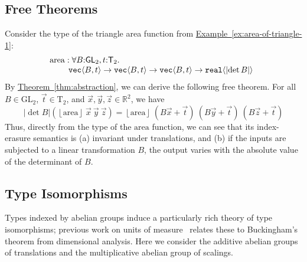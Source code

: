 \documentclass{sigplanconf}
\newcommand{\abs}[1]{\lvert #1 \rvert}
\newcommand{\GL}[1]{\mathrm{GL}_#1}
\newcommand{\SynGL}[1]{\mathsf{GL}_#1}
\newcommand{\Transl}[1]{\mathrm{T}_#1}
\newcommand{\SynTransl}[1]{\mathsf{T}_#1}
\newcommand{\tyPrim}[2]{\textup{\texttt{#1}}\langle #2 \rangle}
\newcommand{\tmSem}[1]{\left\lfloor{#1}\right\rfloor}
\newcommand{\thmref}[1]{\hyperref[#1]{Theorem~\ref*{#1}}}
\newcommand{\exref}[1]{\hyperref[#1]{Example~\ref*{#1}}}
\theoremstyle{examplestyle}
\theoremstyle{restatementstyle}
\begin{document}
\subsection{Free Theorems}
\label{sec:theorems-for-free}

Consider the type of the triangle area %
function from
\exref{ex:area-of-triangle-1}:
\begin{displaymath}
  \begin{array}{@{}l}
    \mathrm{area} : \forall B\mathord:\SynGL{2}, t\mathord:\SynTransl{2}.\ \\
    \hspace{0.8cm}\tyPrim{vec}{B, t} \to \tyPrim{vec}{B, t} \to \tyPrim{vec}{B, t} \to \tyPrim{real}{\abs{\det B}}
  \end{array}
\end{displaymath}
By \thmref{thm:abstraction}, we can derive the following free theorem. For all $B \in \GL{2}$, $\vec{t} \in \Transl{2}$, and $\vec{x}, \vec{y}, \vec{z} \in \mathbb{R}^2$, we have 
\begin{displaymath}
  \abs{\det B}(\tmSem{\mathrm{area}}\ \vec{x}\ \vec{y}\ \vec{z}) = \tmSem{\mathrm{area}}\ (B\vec{x} + \vec{t})\ (B\vec{y} + \vec{t})\ (B\vec{z} + \vec{t})
\end{displaymath}
Thus, directly from the type of the $\mathrm{area}$ function, we can
see that its index-erasure semantics is (a) invariant under
translations, and (b) if the inputs are subjected to a linear
transformation $B$, the output varies with the absolute value of the
determinant of $B$.




\subsection{Type Isomorphisms}
\label{sec:types-indexed-abelian-groups}
Types indexed by abelian groups induce a particularly rich theory of
type isomorphisms; previous work on
units of measure~\cite{kennedy97relational} relates these to
Buckingham's theorem from dimensional analysis. Here we consider the
additive abelian groups of translations and the multiplicative abelian
group of scalings.
\end{document}
